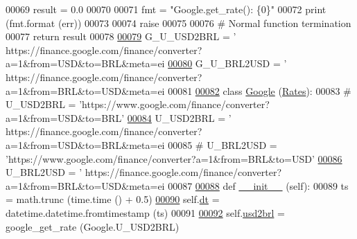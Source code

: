 \begin{DoxyCode}
00069         result = 0.0
00070         
00071         fmt = \textcolor{stringliteral}{"Google.get\_rate(): \{0\}"}
00072         \textcolor{keywordflow}{print} (fmt.format (err))
00073         
00074         \textcolor{keywordflow}{raise}
00075     
00076     \textcolor{comment}{# Normal function termination}
00077     \textcolor{keywordflow}{return} result
00078 
\hypertarget{rates_8py_source.tex_l00079}{}\hyperlink{namespacerates_a0ba47a320577d69e1955c13a384dd662}{00079} G\_U\_USD2BRL = \textcolor{stringliteral}{'
      https://finance.google.com/finance/converter?a=1&from=USD&to=BRL&meta=ei%
\hypertarget{rates_8py_source.tex_l00080}{}\hyperlink{namespacerates_a4b516d1323011d86ff6aef5851ec8fcf}{00080} G\_U\_BRL2USD = \textcolor{stringliteral}{'
      https://finance.google.com/finance/converter?a=1&from=BRL&to=USD&meta=ei%
00081     
\hypertarget{rates_8py_source.tex_l00082}{}\hyperlink{classrates_1_1_google}{00082} \textcolor{keyword}{class }\hyperlink{classrates_1_1_google}{Google} (\hyperlink{classrates_1_1_rates}{Rates}):
00083     \textcolor{comment}{#    U\_USD2BRL = 'https://www.google.com/finance/converter?a=1&from=USD&to=BRL'}
\hypertarget{rates_8py_source.tex_l00084}{}\hyperlink{classrates_1_1_google_a77ef7f5932c48b002697fb187a234d4a}{00084}     U\_USD2BRL = \textcolor{stringliteral}{'
      https://finance.google.com/finance/converter?a=1&from=USD&to=BRL&meta=ei%
00085 \textcolor{comment}{#    U\_BRL2USD = 'https://www.google.com/finance/converter?a=1&from=BRL&to=USD'}
\hypertarget{rates_8py_source.tex_l00086}{}\hyperlink{classrates_1_1_google_a46dbc3fa0a110bf5b66808c29642cfa1}{00086}     U\_BRL2USD = \textcolor{stringliteral}{'
      https://finance.google.com/finance/converter?a=1&from=BRL&to=USD&meta=ei%
00087 
\hypertarget{rates_8py_source.tex_l00088}{}\hyperlink{classrates_1_1_google_a6d9d023db3b4f6f2b585397e3469c396}{00088}     \textcolor{keyword}{def }\hyperlink{classrates_1_1_google_a6d9d023db3b4f6f2b585397e3469c396}{\_\_init\_\_} (self):
00089         ts = math.trunc (time.time () + 0.5)
\hypertarget{rates_8py_source.tex_l00090}{}\hyperlink{classrates_1_1_google_a76574be36237f78780f76bed53e69ab2}{00090}         self.\hyperlink{classrates_1_1_google_a76574be36237f78780f76bed53e69ab2}{dt} = datetime.datetime.fromtimestamp (ts)
00091                 
\hypertarget{rates_8py_source.tex_l00092}{}\hyperlink{classrates_1_1_google_a94c28f6d60d5d6afc075416d7378471c}{00092}         self.\hyperlink{classrates_1_1_google_a94c28f6d60d5d6afc075416d7378471c}{usd2brl} = google\_get\_rate (Google.U\_USD2BRL)
}}}}
\end{DoxyCode}
